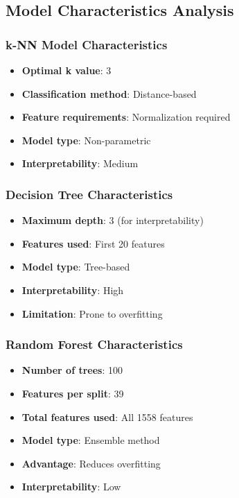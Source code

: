 \subsection{Model Characteristics Analysis}

\subsubsection{k-NN Model Characteristics}
\begin{itemize}
    \item \textbf{Optimal k value}: 3
    \item \textbf{Classification method}: Distance-based
    \item \textbf{Feature requirements}: Normalization required
    \item \textbf{Model type}: Non-parametric
    \item \textbf{Interpretability}: Medium
\end{itemize}

\subsubsection{Decision Tree Characteristics}
\begin{itemize}
    \item \textbf{Maximum depth}: 3 (for interpretability)
    \item \textbf{Features used}: First 20 features
    \item \textbf{Model type}: Tree-based
    \item \textbf{Interpretability}: High
    \item \textbf{Limitation}: Prone to overfitting
\end{itemize}

\subsubsection{Random Forest Characteristics}
\begin{itemize}
    \item \textbf{Number of trees}: 100
    \item \textbf{Features per split}: 39
    \item \textbf{Total features used}: All 1558 features
    \item \textbf{Model type}: Ensemble method
    \item \textbf{Advantage}: Reduces overfitting
    \item \textbf{Interpretability}: Low
\end{itemize}

